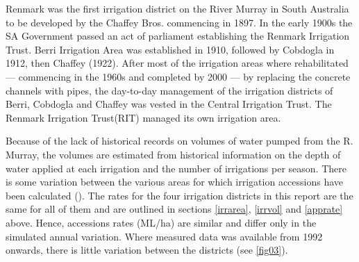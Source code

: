 \documentclass[a4paper, titlepage, 12pt]{article}\usepackage[]{graphicx}\usepackage[]{color}
\makeatletter
\newenvironment{kframe}{%
 \def\at@end@of@kframe{}%
 \ifinner\ifhmode%
  \def\at@end@of@kframe{\end{minipage}}%
  \begin{minipage}{\columnwidth}%
 \fi\fi%
 \def\FrameCommand##1{\hskip\@totalleftmargin \hskip-\fboxsep
 \colorbox{shadecolor}{##1}\hskip-\fboxsep
     \hskip-\linewidth \hskip-\@totalleftmargin \hskip\columnwidth}%
 \MakeFramed {\advance\hsize-\width
   \@totalleftmargin\z@ \linewidth\hsize
   \@setminipage}}%
 {\par\unskip\endMakeFramed%
 \at@end@of@kframe}
\newenvironment{knitrout}{}{} %
\makeatother
\begin{document}
\begin{sffamily}
\begin{knitrout}
\begin{kframe}
{\ttfamily\noindent\bfseries{}}

{\ttfamily\noindent\bfseries\color{errorcolor}{\#\# Error in rbind(cobby, berri, renmark, chaffey): object 'cobby' not found}}

{\ttfamily\noindent\bfseries\color{errorcolor}{\#\# Error in with(alldist[(alldist\$year <= 1935), ], mean(accessions/area, : object 'alldist' not found}}

{\ttfamily\noindent\bfseries\color{errorcolor}{\#\# Error in with(alldist[(alldist\$year <= 1935), ], mean(totappld, na.rm = T)): object 'alldist' not found}}

{\ttfamily\noindent\bfseries\color{errorcolor}{\#\# Error in with(alldist[(alldist\$year >= 1992), ], mean(accessions/area, : object 'alldist' not found}}

{\ttfamily\noindent\bfseries\color{errorcolor}{\#\# Error in with(alldist[(alldist\$year > 1935 \& alldist\$year <= 1992), ], : object 'alldist' not found}}\end{kframe}
\end{knitrout}
Renmark was the first irrigation district on the River Murray in South Australia to be developed by the Chaffey Bros. commencing in 1897. In the early 1900s the SA Government passed an act of parliament establishing the Renmark Irrigation Trust. Berri Irrigation Area was established in 1910, followed by Cobdogla in 1912, then Chaffey (1922). After most of the irrigation areas where rehabilitated --- commencing in the 1960s and completed by 2000 --- by replacing the concrete channels with pipes, the day-to-day management of the irrigation districts of Berri, Cobdogla and Chaffey was vested in the Central Irrigation Trust. The Renmark Irrigation Trust(RIT) managed its own irrigation area. 

Because of the lack of historical records on volumes of water pumped from the R. Murray, the volumes are estimated from historical information on the depth of water applied at each irrigation and the number of irrigations per season. There is some variation between the various areas for which irrigation accessions have been calculated (\citep{Meissner2014, Meissner2012, Meissner2011a, Meissner2011b, Adams2009}). The rates for the four irrigation districts in this report are the same for all of them and are outlined in sections \ref{irrarea}, \ref{irrvol} and \ref{apprate} above. Hence, accessions rates (ML/ha) are similar and differ only in the simulated annual variation. Where measured data was available from 1992 onwards, there is little variation between the districts (see \ref{fig03}).


\end{sffamily}
\end{document}
